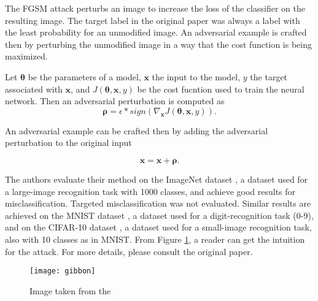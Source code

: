 The FGSM attack perturbs an image to increase the loss of the classifier on the resulting image. The target label in the original paper \cite{fgsm-original} was always a label with the least probability for an unmodified image. An adversarial example is crafted then by perturbing the unmodified image in a way that the cost function is being maximized.

Let $\pmb \theta$ be the parameters of a model, $\pmb x$ the input to the model, $y$ the target associated with $\pmb x$, and $J (\pmb \theta, \pmb x, y)$ be the cost fucntion used to train the neural network. Then an adversarial perturbation is computed as 
\[ 
\pmb \rho = \epsilon * sign (\nabla_{\pmb x} J(\pmb \theta, \pmb x, y)).
\]

An adversarial example can be crafted then by adding the adversarial perturbation to the original input

\[\pmb x = \pmb x + \pmb \rho .\]
 
The authors evaluate their method on the ImageNet dataset \cite{datasetImageNet}, a dataset used for a large-image recognition task with 1000 classes, and achieve good results for misclassification. Targeted misclassification was not evaluated. Similar results are achieved on the MNIST dataset \cite{datasetMNIST}, a dataset used for a digit-recognition task (0-9), and on the CIFAR-10 dataset \cite{datasetCIFAR10}, a dataset used for a small-image recognition task, also with 10 classes as in MNIST. From Figure \ref{fig:gibbon}, a reader can get the intuition for the attack. For more details, please consult the original paper.

\begin{figure}[h]
\texttt{[image: gibbon]}
\caption{Image taken from the \cite{fgsm-original}}
\label{fig:gibbon}
\end{figure}

